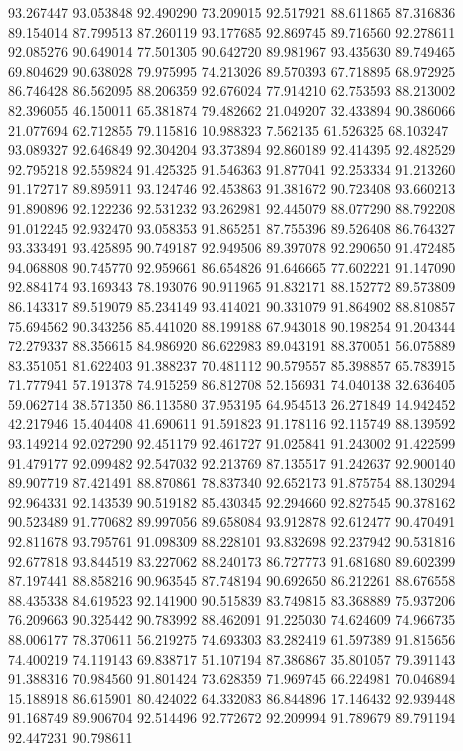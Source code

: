93.267447
93.053848
92.490290
73.209015
92.517921
88.611865
87.316836
89.154014
87.799513
87.260119
93.177685
92.869745
89.716560
92.278611
92.085276
90.649014
77.501305
90.642720
89.981967
93.435630
89.749465
69.804629
90.638028
79.975995
74.213026
89.570393
67.718895
68.972925
86.746428
86.562095
88.206359
92.676024
77.914210
62.753593
88.213002
82.396055
46.150011
65.381874
79.482662
21.049207
32.433894
90.386066
21.077694
62.712855
79.115816
10.988323
7.562135
61.526325
68.103247
93.089327
92.646849
92.304204
93.373894
92.860189
92.414395
92.482529
92.795218
92.559824
91.425325
91.546363
91.877041
92.253334
91.213260
91.172717
89.895911
93.124746
92.453863
91.381672
90.723408
93.660213
91.890896
92.122236
92.531232
93.262981
92.445079
88.077290
88.792208
91.012245
92.932470
93.058353
91.865251
87.755396
89.526408
86.764327
93.333491
93.425895
90.749187
92.949506
89.397078
92.290650
91.472485
94.068808
90.745770
92.959661
86.654826
91.646665
77.602221
91.147090
92.884174
93.169343
78.193076
90.911965
91.832171
88.152772
89.573809
86.143317
89.519079
85.234149
93.414021
90.331079
91.864902
88.810857
75.694562
90.343256
85.441020
88.199188
67.943018
90.198254
91.204344
72.279337
88.356615
84.986920
86.622983
89.043191
88.370051
56.075889
83.351051
81.622403
91.388237
70.481112
90.579557
85.398857
65.783915
71.777941
57.191378
74.915259
86.812708
52.156931
74.040138
32.636405
59.062714
38.571350
86.113580
37.953195
64.954513
26.271849
14.942452
42.217946
15.404408
41.690611
91.591823
91.178116
92.115749
88.139592
93.149214
92.027290
92.451179
92.461727
91.025841
91.243002
91.422599
91.479177
92.099482
92.547032
92.213769
87.135517
91.242637
92.900140
89.907719
87.421491
88.870861
78.837340
92.652173
91.875754
88.130294
92.964331
92.143539
90.519182
85.430345
92.294660
92.827545
90.378162
90.523489
91.770682
89.997056
89.658084
93.912878
92.612477
90.470491
92.811678
93.795761
91.098309
88.228101
93.832698
92.237942
90.531816
92.677818
93.844519
83.227062
88.240173
86.727773
91.681680
89.602399
87.197441
88.858216
90.963545
87.748194
90.692650
86.212261
88.676558
88.435338
84.619523
92.141900
90.515839
83.749815
83.368889
75.937206
76.209663
90.325442
90.783992
88.462091
91.225030
74.624609
74.966735
88.006177
78.370611
56.219275
74.693303
83.282419
61.597389
91.815656
74.400219
74.119143
69.838717
51.107194
87.386867
35.801057
79.391143
91.388316
70.984560
91.801424
73.628359
71.969745
66.224981
70.046894
15.188918
86.615901
80.424022
64.332083
86.844896
17.146432
92.939448
91.168749
89.906704
92.514496
92.772672
92.209994
91.789679
89.791194
92.447231
90.798611
